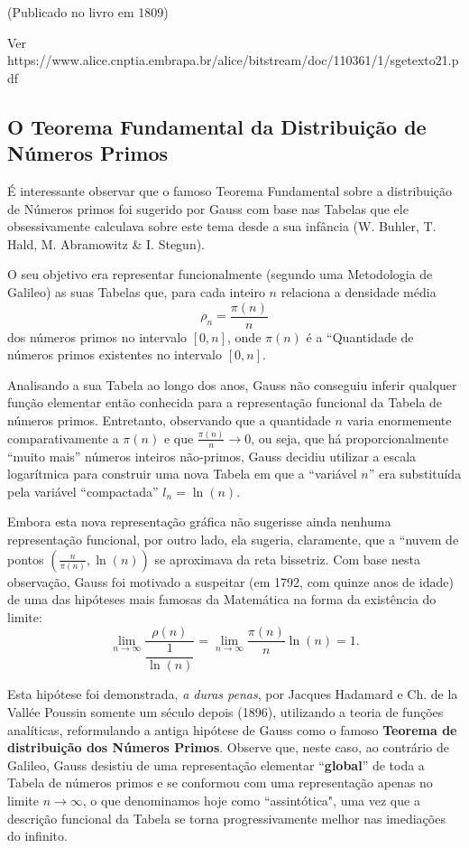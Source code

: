 (Publicado no livro em 1809)


Ver https://www.alice.cnptia.embrapa.br/alice/bitstream/doc/110361/1/sgetexto21.pdf



\subsection{O Teorema Fundamental da Distribuição de Números Primos}

    É interessante observar que o famoso Teorema Fundamental sobre a distribuição de Números primos foi sugerido por Gauss com base nas Tabelas que ele obsessivamente calculava sobre este tema desde a sua infância (W. Buhler, T. Hald, M. Abramowitz \& I. Stegun).
    
    O seu objetivo era representar funcionalmente (segundo uma Metodologia de Galileo) as suas Tabelas que, para cada inteiro \(n\) relaciona a densidade média
    \[\rho_{n} = \frac{\pi(n)}{n}\]
    dos números primos no intervalo \([0, n]\), onde \(\pi(n)\) é a ``Quantidade de números primos existentes no intervalo \([0, n]\).
    
    Analisando a sua Tabela ao longo dos anos, Gauss não conseguiu inferir qualquer função elementar então conhecida para a representação funcional da Tabela de números primos. Entretanto, observando que a quantidade \(n\) varia enormemente comparativamente a \(\pi(n)\) e que \(\frac{\pi(n)}{n} \to 0\), ou seja, que há proporcionalmente ``muito mais'' números inteiros não-primos, Gauss decidiu utilizar a escala logarítmica para construir uma nova Tabela em que a ``variável \(n\)'' era substituída pela variável ``compactada'' \(l_n = \ln(n)\).
    
    Embora esta nova representação gráfica não sugerisse ainda nenhuma representação funcional, por outro lado, ela sugeria, claramente, que a ``nuvem de pontos \(\left(\frac{n}{\pi(n)}, \ln(n)\right)\) se aproximava da reta bissetriz. Com base nesta observação, Gauss foi motivado a suspeitar (em 1792, com quinze anos de idade) de uma das hipóteses mais famosas da Matemática na forma da existência do limite:
    \[\displaystyle\lim_{n \to \infty} \dfrac{\rho(n)}{\dfrac{1}{\ln(n)}} = \lim_{n \to \infty} \dfrac{\pi(n)}{n} \ln(n) = 1.\]
    
    Esta hipótese foi demonstrada, \textit{a duras penas}, por Jacques Hadamard e Ch. de la Vallée Poussin somente um século depois (1896), utilizando a teoria de funções analíticas, reformulando a antiga hipótese de Gauss como o famoso \textbf{Teorema de distribuição dos Números Primos}. Observe que, neste caso, ao contrário de Galileo, Gauss desistiu de uma representação elementar ``\textbf{global}'' de toda a Tabela de números primos e se conformou com uma representação apenas no limite \(n \to \infty\), o que denominamos hoje como ``assintótica", uma vez que a descrição funcional da Tabela se torna progressivamente melhor nas imediações do infinito.

